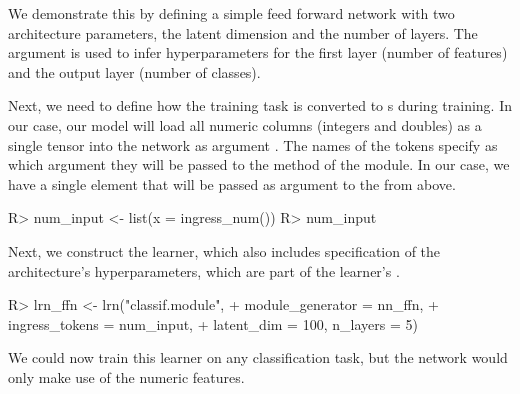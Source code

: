 \documentclass[article]{jss}
\theoremstyle{definition}
\begin{document}
We demonstrate this by defining a simple feed forward network with two architecture parameters, the latent dimension and the number of layers.
The  argument is used to infer hyperparameters for the first layer (number of features) and the output layer (number of classes).


Next, we need to define how the training task is converted to s during training.
In our case, our model will load all numeric columns (integers and doubles) as a single tensor into the network as argument .
The names of the tokens specify as which argument they will be passed to the  method of the module.
In our case, we have a single element  that will be passed as argument  to the  from above.

\begin{CodeInput}
R> num_input <- list(x = ingress_num())
R> num_input
\end{CodeInput}


Next, we construct the learner, which also includes specification of the architecture's hyperparameters, which are part of the learner's .

\begin{CodeInput}
R> lrn_ffn <- lrn("classif.module",
+    module_generator = nn_ffn,
+    ingress_tokens = num_input,
+    latent_dim = 100, n_layers = 5)
\end{CodeInput}

We could now train this learner on any \mlrt{} classification task, but the network would only make use of the numeric features.
\end{document}
